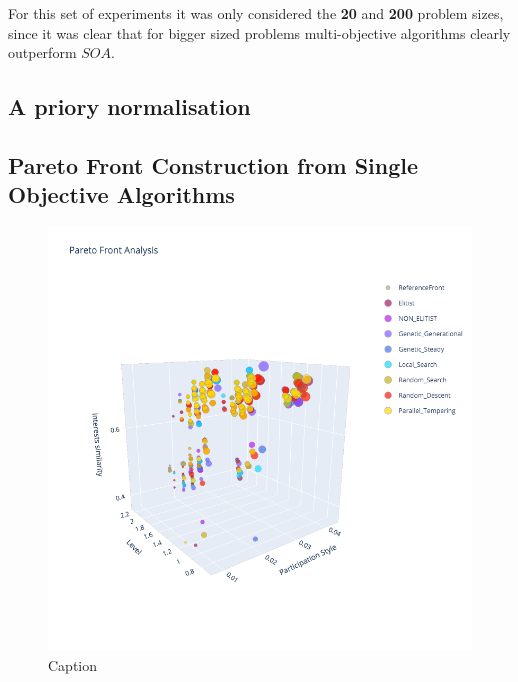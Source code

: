 For this set of experiments it was only considered the \textbf{20} and \textbf{200} problem sizes, since it was clear that for bigger sized problems multi-objective algorithms clearly outperform $SOA$.

\subsection{A priory normalisation}

\subsection{Pareto Front Construction from Single Objective Algorithms}

\begin{figure}
    \centering
    \includegraphics[width=\textwidth]{images/3d_front_mixed_20_soa.png}
    \caption{Caption}
    \label{fig:my_label}
\end{figure}

